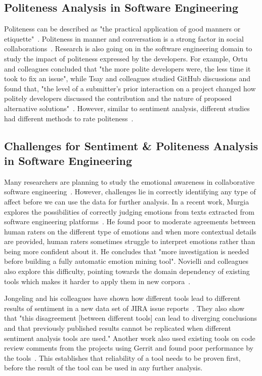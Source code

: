 \subsection{Politeness Analysis in Software Engineering}

Politeness can be described as "the practical application of good manners or etiquette"~\cite{wiki:pol}. Politeness in manner and conversation is a strong factor in social collaborations~\cite{ortu2015would,wang2008politeness}. Research is also going on in the software engineering domain to study the impact of politeness expressed by the developers. For example, Ortu and colleagues concluded that "the more polite developers were, the less time it took to fix an issue", while Tsay and colleagues studied GitHub discussions and found that, "the level of a submitter's prior interaction on a project changed how politely developers discussed the contribution and the nature of proposed alternative solutions"~\cite{ortu2015would,tsay2014let}. However, similar to sentiment analysis, different studies had different methods to rate politeness~\cite{tsay2014let,brownsoftware}.


\subsection{Challenges for Sentiment \& Politeness Analysis in Software Engineering}

Many researchers are planning to study the emotional awareness in collaborative software engineering~\cite{dewan2015towards}. However, challenges lie in correctly identifying any type of affect before we can use the data for further analysis. In a recent work, Murgia explores the possibilities of correctly judging emotions from texts extracted from software engineering platforms~\cite{murgia2014developers}. He found poor to moderate agreements between human raters on the different type of emotions and when more contextual details are provided, human raters sometimes struggle to interpret emotions rather than being more confident about it. He concludes that "more investigation is needed before building a fully automatic emotion mining tool". Novielli and colleagues also explore this difficulty, pointing towards the domain dependency of existing tools which makes it harder to apply them in new corpora~\cite{novielli2015challenges}. 

Jongeling and his colleagues have shown how different tools lead to different results of sentiment in a new data set of JIRA issue reports~\cite{jongeling2017negative}. They also show that "this disagreement [between different tools] can lead to diverging conclusions and that previously published results cannot be replicated when different sentiment analysis tools are used." Another work also used existing tools on code review comments from the projects using Gerrit and found poor performance by the tools~\cite{ahmed2017senticr}. This establishes that reliability of a tool needs to be proven first, before the result of the tool can be used in any further analysis.

